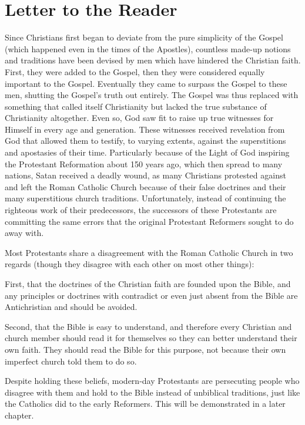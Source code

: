 \documentclass[chapterpreface_main.tex]{subfiles}
\begin{document}
	

	\section{Letter to the Reader}
	Since Christians first began to deviate from the pure simplicity of the Gospel (which happened even in the times of the Apostles), countless made-up notions and traditions have been devised by men which have hindered the Christian faith. First, they were added to the Gospel, then they were considered equally important to the Gospel. Eventually they came to surpass the Gospel to these men, shutting the Gospel's truth out entirely. The Gospel was thus replaced with something that called itself Christianity but lacked the true substance of Christianity altogether. Even so, God saw fit to raise up true witnesses for Himself in every age and generation. These witnesses received revelation from God that allowed them to testify, to varying extents, against the superstitions and apostasies of their time. Particularly because of the Light of God inspiring the Protestant Reformation about 150 years ago, which then spread to many nations, Satan received a deadly wound, as many Christians protested against and left the Roman Catholic Church because of their false doctrines and their many superstitious church traditions. Unfortunately, instead of continuing the righteous work of their predecessors, the successors of these Protestants are committing the same errors that the original Protestant Reformers sought to do away with.
	
	Most Protestants share a disagreement with the Roman Catholic Church in two regards (though they disagree with each other on most other things):
	
	First, that the doctrines of the Christian faith are founded upon the Bible, and any principles or doctrines with contradict or even just absent from the Bible are Antichristian and should be avoided.
	
	Second, that the Bible is easy to understand, and therefore every Christian and church member should read it for themselves so they can better understand their own faith. They should read the Bible for this purpose, not because their own imperfect church told them to do so.
	
	Despite holding these beliefs, modern-day Protestants are persecuting people who disagree with them and hold to the Bible instead of unbiblical traditions, just like the Catholics did to the early Reformers. This will be demonstrated in a later chapter.
	
\end{document}

